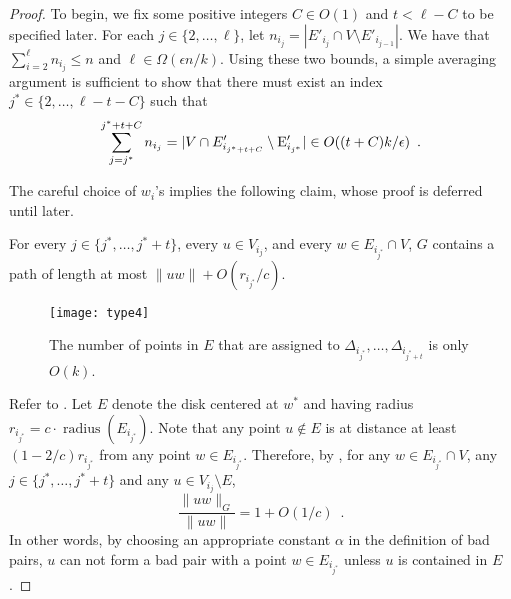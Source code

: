\documentclass{patmorin}
\DeclareMathOperator{\radius}{radius}
\begin{document}
\begin{proof}
  To begin, we fix some positive integers $C\in O(1)$ and $t< \ell
  - C$ to be specified later.  For each $j\in\{2,\ldots,\ell\}$,
  let $n_{i_j}=|E'_{i_j}\cap V\setminus E'_{i_{j-1}}|$. We have that
  $\sum_{i=2}^{\ell} n_{i_j} \le n$ and $\ell \in\Omega(\epsilon n/k)$.
  Using these two bounds, a simple averaging argument is sufficient
  to show that there must exist an index $j^*\in\{2,\ldots,\ell-t-C\}$
  such that
  \begin{equation}
     \sum_{j=j^*}^{j^*+t+C} n_{i_j}
        = |V\cap E'_{i_{j^*+t+C}}\setminus \E'_{i_{j^*}}| 
          \in O((t+C)k/\epsilon) \enspace . \eqlabel{sparse}
  \end{equation}

  The careful choice of $w_i$'s implies the following claim, whose proof
  is deferred until later.
  \begin{clm}
    For every $j\in\{j^*,\ldots,j^*+t\}$, every $u\in V_{i_j}$, and
    every $w\in E_{i_{j^*}}\cap V$, $G$ contains a path of length at most
    $\|uw\|+O(r_{i_{j^*}}/c)$.
  \end{clm}

  
  \begin{figure}
    \begin{center}
      \texttt{[image: type4]}
    \end{center}
    \caption{The number of points in $E$ that are assigned to
      $\Delta_{i_{j^*}},\ldots,\Delta_{i_{j^*+t}}$
      is only $O(k)$.}
  \end{figure}

  Refer to .  Let $E$ denote the disk centered at $w^*$
  and having radius $r_{i_{j^*}}=c\cdot\radius(E_{i_{j^*}})$.  Note that
  any point $u\not\in E$ is at distance at least $(1-2/c)r_{i_{j^*}}$ from
  any point $w\in E_{i_{j^*}}$.  Therefore, by , for any
  $w\in E_{i_{j^*}}\cap V$, any $j\in\{j^*,\ldots,j^*+t\}$ and any $u\in
  V_{i_{j}}\setminus E$,
  \[  
     \frac{\|uw\|_G}{\|uw\|} = 1+O(1/c) \enspace . 
  \]
  In other words, by choosing an appropriate constant $\alpha$ in the
  definition of bad pairs, $u$ can not form a bad pair with a point
  $w\in E_{i_{j^*}}$ unless $u$ is contained in $E$.



\end{proof}
\end{document}
